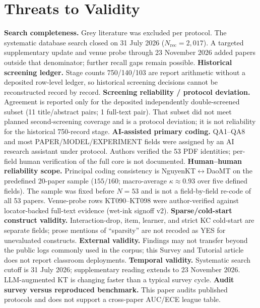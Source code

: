 \documentclass[lettersize,journal]{IEEEtran}
\begin{document}
\section{Threats to Validity}
\label{sec:validity}
\textbf{Search completeness.} Grey literature was excluded per protocol. The systematic database search closed on 31 July 2026 ($N_{\mathrm{rec}}=2{,}017$). A targeted supplementary update and venue probe through 23 November 2026 added papers outside that denominator; further recall gaps remain possible.
\textbf{Historical screening ledger.} Stage counts 750/140/103 are report arithmetic without a deposited row-level ledger, so historical screening decisions cannot be reconstructed record by record.
\textbf{Screening reliability / protocol deviation.} Agreement is reported only for the deposited independently double-screened subset (11 title/abstract pairs; 1 full-text pair). That subset did not meet planned second-screening coverage and is a protocol deviation; it is not reliability for the historical 750-record stage.
\textbf{AI-assisted primary coding.} QA1--QA8 and most PAPER/MODEL/EXPERIMENT fields were assigned by an AI research assistant under protocol. Authors verified the 53 PDF identities; per-field human verification of the full core is not documented.
\textbf{Human--human reliability scope.} Principal coding consistency is NguyenKT$\leftrightarrow$DaoMT on the predefined 20-paper sample ($155/160$; macro-average $\kappa\approx 0.93$ over five defined fields). The sample was fixed before $N=53$ and is not a field-by-field re-code of all 53 papers. Venue-probe rows KT090--KT098 were author-verified against locator-backed full-text evidence (wet-ink signoff v2).
\textbf{Sparse/cold-start construct validity.} Interaction-drop, item, learner, and strict KC cold-start are separate fields; prose mentions of ``sparsity'' are not recoded as YES for unevaluated constructs.
\textbf{External validity.} Findings may not transfer beyond the public logs commonly used in the corpus; this Survey and Tutorial article does not report classroom deployments.
\textbf{Temporal validity.} Systematic search cutoff is 31 July 2026; supplementary reading extends to 23 November 2026. LLM-augmented KT is changing faster than a typical survey cycle.
\textbf{Audit survey versus reproduced benchmark.} This paper audits published protocols and does not support a cross-paper AUC/ECE league table.
\end{document}
